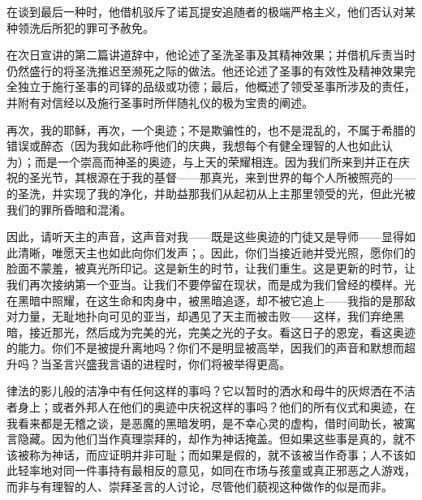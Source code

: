 在谈到最后一种时，他借机驳斥了诺瓦提安追随者的极端严格主义，他们否认对某种领洗后所犯的罪可予赦免。\par

在次日宣讲的第二篇讲道辞中，他论述了圣洗圣事及其精神效果；并借机斥责当时仍然盛行的将圣洗推迟至濒死之际的做法。他还论述了圣事的有效性及精神效果完全独立于施行圣事的司铎的品级或功德；最后，他概述了领受圣事所涉及的责任，并附有对信经以及施行圣事时所伴随礼仪的极为宝贵的阐述。\par

再次，我的耶稣，再次，一个奥迹；不是欺骗性的，也不是混乱的，不属于希腊的错误或醉态（因为我如此称呼他们的庆典，我想每个有健全理智的人也如此认为）；而是一个崇高而神圣的奥迹，与上天的荣耀相连。因为我们所来到并正在庆祝的圣光节，其根源在于我的基督——那真光，来到世界的每个人所被照亮的——的圣洗，并实现了我的净化，并助益那我们从起初从上主那里领受的光，但此光被我们的罪所昏暗和混淆。\par

因此，请听天主的声音，这声音对我——既是这些奥迹的门徒又是导师——显得如此清晰，唯愿天主也如此向你们发声；。因此，你们当接近祂并受光照，愿你们的脸面不蒙羞，被真光所印记。这是新生的时节，让我们重生。这是更新的时节，让我们再次接纳第一个亚当。让我们不要停留在现状，而是成为我们曾经的模样。光在黑暗中照耀，在这生命和肉身中，被黑暗追逐，却不被它追上——我指的是那敌对力量，无耻地扑向可见的亚当，却遇见了天主而被击败——这样，我们弃绝黑暗，接近那光，然后成为完美的光，完美之光的子女。看这日子的恩宠，看这奥迹的能力。你们不是被提升离地吗？你们不是明显被高举，因我们的声音和默想而超升吗？当圣言兴盛我言语的进程时，你们将被举得更高。\par

律法的影儿般的洁净中有任何这样的事吗？它以暂时的洒水和母牛的灰烬洒在不洁者身上；或者外邦人在他们的奥迹中庆祝这样的事吗？他们的所有仪式和奥迹，在我看来都是无稽之谈，是恶魔的黑暗发明，是不幸心灵的虚构，借时间助长，被寓言隐藏。因为他们当作真理崇拜的，却作为神话掩盖。但如果这些事是真的，就不该被称为神话，而应证明并非可耻；而如果是假的，就不该被当作奇事；人不该如此轻率地对同一件事持有最相反的意见，如同在市场与孩童或真正邪恶之人游戏，而非与有理智的人、崇拜圣言的人讨论，尽管他们藐视这种做作的似是而非。\par

